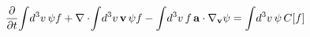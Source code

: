 \documentclass[preview]{standalone}
\begin{document}
\begin{align*}
\special{dvisvgm:raw <g id='unique000'>}\pdv{}{t}\!\int\! d^3v\,\psi f+\nabla\cdot\!\int\! d^3v\,\va v\,\psi f-\int\! d^3v\,f\,\va a\cdot\nabla_{\va v}\psi=\int\! d^3v\,\psi\,C[f]\special{dvisvgm:raw </g>}
\end{align*}
\end{document}
